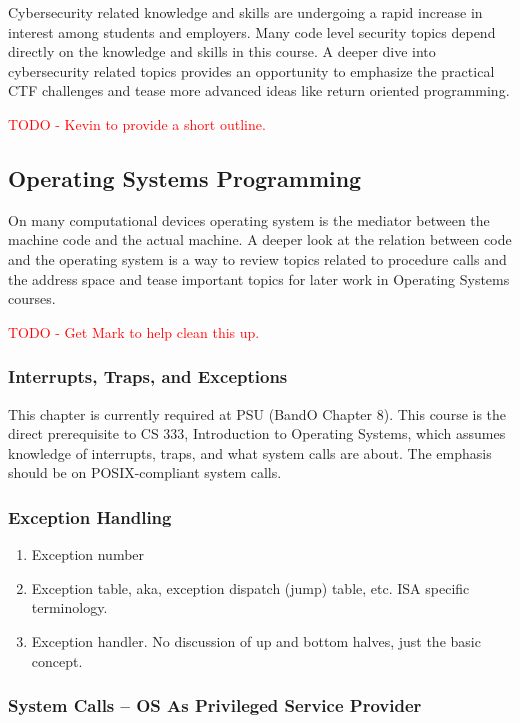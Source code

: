 \documentclass[12pt,letterpaper]{article}
\begin{document}
	Cybersecurity related knowledge and skills are undergoing a rapid increase in interest among students and employers. Many code level security topics depend directly on the knowledge and skills in this course. A deeper dive into cybersecurity related topics provides an opportunity to emphasize the practical CTF challenges and tease more advanced ideas like return oriented programming.
	
	\textcolor{red}{TODO - Kevin to provide a short outline.}

	\subsection{Operating Systems Programming}

	On many computational devices operating system is the mediator between the machine code and the actual machine. A deeper look at the relation between code and the operating system is a way to review topics related to procedure calls and the address space and tease important topics for later work in Operating Systems courses.
	
	\textcolor{red}{TODO - Get Mark to help clean this up.}

	\subsubsection{Interrupts, Traps, and Exceptions}
	This chapter is currently required at PSU (BandO Chapter 8). This course is the direct prerequisite to CS 333, Introduction to Operating Systems, which assumes knowledge of interrupts, traps, and what system calls are about. The emphasis should be on POSIX-compliant system calls.
	
	\subsubsection{Exception Handling}
	\begin{enumerate}
		\item Exception number
		\item Exception table, aka, exception dispatch (jump) table, etc. ISA specific terminology.
		\item Exception handler. No discussion of up and bottom halves, just the basic concept.
	\end{enumerate}
		
	\subsubsection{System Calls -- OS As Privileged Service Provider}
\end{document}
